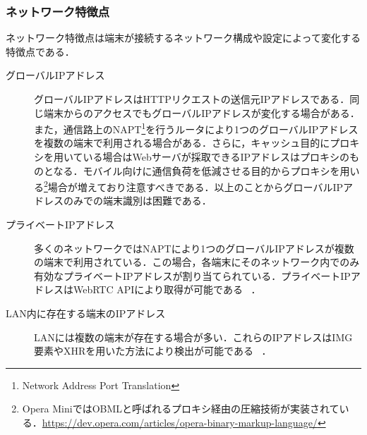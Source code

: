 \subsubsection{ネットワーク特徴点}
ネットワーク特徴点は端末が接続するネットワーク構成や設定によって変化する特徴点である．
\begin{description}
\item[グローバルIPアドレス]グローバルIPアドレスはHTTPリクエストの送信元IPアドレスである．同じ端末からのアクセスでもグローバルIPアドレスが変化する場合がある．また，通信路上のNAPT\footnote{Network Address Port Translation}を行うルータにより1つのグローバルIPアドレスを複数の端末で利用される場合がある．さらに，キャッシュ目的にプロキシを用いている場合はWebサーバが採取できるIPアドレスはプロキシのものとなる．モバイル向けに通信負荷を低減させる目的からプロキシを用いる\footnote{Opera MiniではOBMLと呼ばれるプロキシ経由の圧縮技術が実装されている．\url{https://dev.opera.com/articles/opera-binary-markup-language/}}場合が増えており注意すべきである．以上のことからグローバルIPアドレスのみでの端末識別は困難である．
\item[プライベートIPアドレス]多くのネットワークではNAPTにより1つのグローバルIPアドレスが複数の端末で利用されている．この場合，各端末にそのネットワーク内でのみ有効なプライベートIPアドレスが割り当てられている．プライベートIPアドレスはWebRTC APIにより取得が可能である~\cite{細井理央2015ブラウザが属するネットワークの情報を採取する} ．
\item[LAN内に存在する端末のIPアドレス]LANには複数の端末が存在する場合が多い．これらのIPアドレスはIMG要素やXHRを用いた方法により検出が可能である~\cite{細井理央2015ブラウザが属するネットワークの情報を採取する} ．
\end{description}
